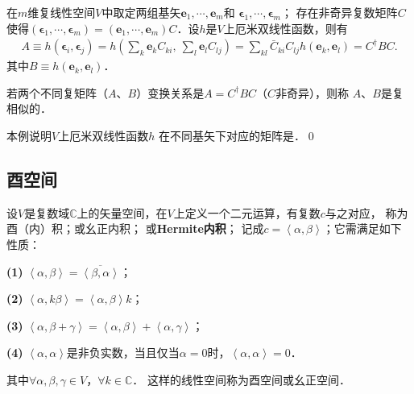 \begin{example}
    在$m$维复线性空间$V$中取定两组基矢$\boldsymbol{e}_1,\cdots,\boldsymbol{e}_m$和
    $\boldsymbol{\epsilon}_1,\cdots,\boldsymbol{\epsilon}_m$；
    存在非奇异复数矩阵$C$使得$(\boldsymbol{\epsilon}_1,\cdots,\boldsymbol{\epsilon}_m)
    =(\boldsymbol{e}_1,\cdots,\boldsymbol{e}_m)C$．设$h$是$V$上厄米双线性函数，则有
    \begin{align*}
        A\equiv h(\boldsymbol{\epsilon}_i, \boldsymbol{\epsilon}_j)
        =h\left(\sum_k \boldsymbol{e}_k C_{ki},\ \sum_l \boldsymbol{e}_l C_{lj}\right)
        =\sum_{kl} \bar{C}_{ki} C_{lj} h(\boldsymbol{e}_k, \boldsymbol{e}_l)
        =C^\dagger B C. 
    \end{align*}
    其中$B\equiv h(\boldsymbol{e}_k, \boldsymbol{e}_l)$．    
    
    若两个不同复矩阵（$A$、$B$）变换关系是$A= C^\dagger B C$（$C$非奇异），则称
    $A$、$B$是{\heiti 复相似的}．
    
    本例说明$V$上厄米双线性函数$h$
    在不同基矢下对应的矩阵是．\qed
\end{example}



\subsection{酉空间}\label{chcx:sec_unitary}
\begin{definition} \label{chcx:def_unitary-space}
    设$V$是复数域$\mathbb{C}$上的矢量空间，在$V$上定义一个二元运算，有复数$c$与之对应，
    称为{\heiti 酉（内）积}；或{\heiti 幺正内积}；
    或{\heiti \bfseries Hermite内积}；
    记成$c=\left<\alpha,\beta\right>$；它需满足如下性质：
    
    {\bfseries (1)} $\left<\alpha,\beta\right>=\overline{\left<\beta,\alpha\right>}$；
    
    {\bfseries (2)} $\left<\alpha,k\beta\right>=\left<\alpha,\beta\right>k$；
    
    {\bfseries (3)} $\left<\alpha,\beta+\gamma\right>=\left<\alpha,\beta\right>+\left<\alpha,\gamma\right>$； 
    
    {\bfseries (4)} $\left<\alpha,\alpha\right>$是非负实数，当且仅当$\alpha=0$时，$\left<\alpha,\alpha\right> = 0$．
    
    \noindent 其中$\forall\alpha,\beta,\gamma \in V$，$\forall k\in \mathbb{C}$．
    这样的线性空间称为{\heiti 酉空间}或{\heiti 幺正空间}．
\end{definition}

